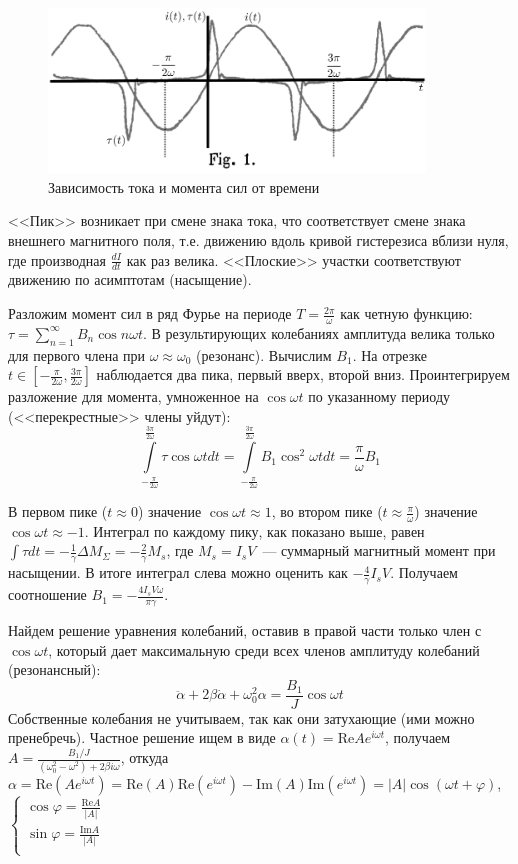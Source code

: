 \documentclass[a4paper]{article}
\begin{document}
\begin{figure}[H]
	\centering
	\includegraphics[width=10cm]{fig1.png}
	\caption{Зависимость тока и момента сил от времени}
\end{figure}
<<Пик>> возникает при смене знака тока, что соответствует смене знака внешнего магнитного поля, т.е. движению вдоль кривой гистерезиса вблизи нуля, где производная $\frac{dI}{dt}$ как раз велика. <<Плоские>> участки соответствуют движению по асимптотам (насыщение).

Разложим момент сил в ряд Фурье на периоде $T=\frac{2\pi}{\omega}$ как четную функцию: $\tau=\sum\limits_{n=1}^{\infty}B_n\cos n\omega t$. В результирующих колебаниях амплитуда велика только для первого члена при $\omega\approx\omega_0$ (резонанс). Вычислим $B_1$. На отрезке $t\in[-\frac{\pi}{2\omega},\frac{3\pi}{2\omega}]$ наблюдается два пика, первый вверх, второй вниз. Проинтегрируем разложение для момента, умноженное на $\cos\omega t$ по указанному периоду (<<перекрестные>> члены уйдут): $$\int\limits_{-\frac{\pi}{2\omega}}^{\frac{3\pi}{2\omega}}\tau\cos\omega tdt=\int\limits_{-\frac{\pi}{2\omega}}^{\frac{3\pi}{2\omega}}B_1\cos^2\omega tdt=\frac{\pi}{\omega}B_1$$

В первом пике ($t\approx0$) значение $\cos\omega t\approx 1$, во втором пике ($t\approx \frac{\pi}{\omega}$) значение $\cos\omega t\approx -1$. Интеграл по каждому пику, как показано выше, равен $\int \tau dt=-\frac{1}{\gamma}\Delta M_\Sigma=-\frac{2}{\gamma}M_s$, где $M_s=I_sV$~--- суммарный магнитный момент при насыщении. В итоге интеграл слева можно оценить как $-\frac{4}{\gamma}I_sV$. Получаем соотношение $B_1=-\frac{4I_sV\omega}{\pi\gamma}$.

Найдем решение уравнения колебаний, оставив в правой части только член с $\cos\omega t$, который дает максимальную среди всех членов амплитуду колебаний (резонансный):
$$
\ddot{\alpha}+2\beta\dot{\alpha}+\omega_0^2\alpha=\frac{B_1}{J}\cos\omega t
$$
Собственные колебания не учитываем, так как они затухающие (ими можно пренебречь). Частное решение ищем в виде $\alpha(t)=\mbox{Re} Ae^{i\omega t}$, получаем $A=\frac{B_1/J}{(\omega_0^2-\omega^2)+2\beta i\omega}$, откуда $\alpha=\mbox{Re}(Ae^{i\omega t})=\mbox{Re}(A)\mbox{Re}(e^{i\omega t})-\mbox{Im}(A)\mbox{Im}(e^{i\omega t})=|A|\cos(\omega t+\varphi)$, $\begin{cases}
\cos\varphi=\frac{\mbox{Re}A}{|A|}\\
\sin\varphi=\frac{\mbox{Im}A}{|A|}\\
\end{cases}$
\end{document}
